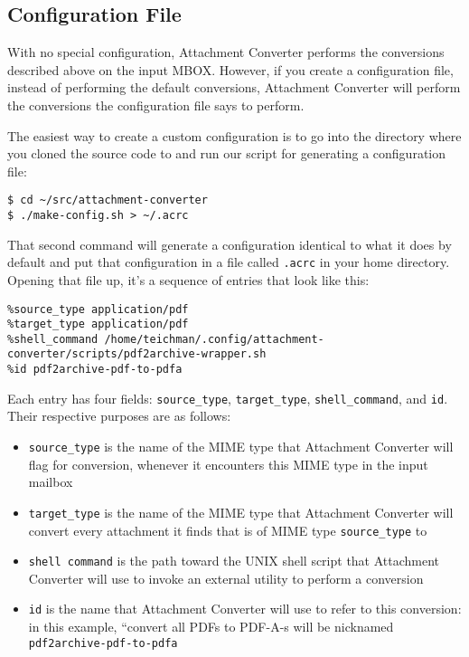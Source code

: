 \documentclass[11pt]{article}
\begin{document}
\subsection{Configuration File}
\label{sec:org11adf3f}

With no special configuration, Attachment Converter performs the
conversions described above on the input MBOX.  However, if you create
a configuration file, instead of performing the default conversions,
Attachment Converter will perform the conversions the configuration
file says to perform.

The easiest way to create a custom configuration is to go into the
directory where you cloned the source code to and run our script for
generating a configuration file:

\begin{verbatim}
$ cd ~/src/attachment-converter
$ ./make-config.sh > ~/.acrc
\end{verbatim}

That second command will generate a configuration identical to what it
does by default and put that configuration in a file called \texttt{.acrc} in
your home directory. Opening that file up, it's a sequence of entries
that look like this:

\footnotesize

\begin{verbatim}
%source_type application/pdf
%target_type application/pdf
%shell_command /home/teichman/.config/attachment-converter/scripts/pdf2archive-wrapper.sh
%id pdf2archive-pdf-to-pdfa
\end{verbatim}

\normalsize

Each entry has four fields: \texttt{source\_type}, \texttt{target\_type},
\texttt{shell\_command}, and \texttt{id}.  Their respective purposes are as follows:

\begin{itemize}
\item \texttt{source\_type} is the name of the MIME type that Attachment Converter
will flag for conversion, whenever it encounters this MIME type in
the input mailbox
\item \texttt{target\_type} is the name of the MIME type that Attachment Converter
will convert every attachment it finds that is of MIME type
\texttt{source\_type} to
\item \texttt{shell command} is the path toward the UNIX shell script that
Attachment Converter will use to invoke an external utility to
perform a conversion
\item \texttt{id} is the name that Attachment Converter will use to refer to this
conversion: in this example, ``convert all PDFs to PDF-A-s will be
nicknamed \texttt{pdf2archive-pdf-to-pdfa}
\end{itemize}
\end{document}
